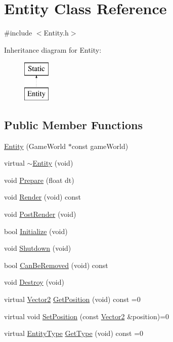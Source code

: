 \hypertarget{class_entity}{
\section{Entity Class Reference}
\label{class_entity}
}


{\ttfamily \#include $<$Entity.h$>$}

Inheritance diagram for Entity:\begin{figure}[H]
\begin{center}
\leavevmode
\includegraphics[height=2.000000cm]{class_entity}
\end{center}
\end{figure}
\subsection*{Public Member Functions}
\begin{DoxyCompactItemize}
\item 
\hyperlink{class_entity_af7b7088ca610b9f247110ccf47ed178b}{Entity} (GameWorld $\ast$const gameWorld)
\item 
virtual \hyperlink{class_entity_a6e8406be37172eb7f4e89dd3ba674113}{$\sim$Entity} (void)
\item 
void \hyperlink{class_entity_a0a0be12a8170540fed0ce3de68f46790}{Prepare} (float dt)
\item 
void \hyperlink{class_entity_a64da675ba3c24b2e4a3ee89917a5c970}{Render} (void) const 
\item 
void \hyperlink{class_entity_a8d03dea10779e4e91b4aef0fb7f571bc}{PostRender} (void)
\item 
bool \hyperlink{class_entity_a81982ee7714b5126e09ad3e82207f146}{Initialize} (void)
\item 
void \hyperlink{class_entity_a673a3a5c822c734d641e918a7a73f6e7}{Shutdown} (void)
\item 
bool \hyperlink{class_entity_a2da196bad22f7c5a95d47564c7d0ea04}{CanBeRemoved} (void) const 
\item 
void \hyperlink{class_entity_a71b297ca801c1b3170a885a6f4d481c1}{Destroy} (void)
\item 
virtual \hyperlink{struct_vector2}{Vector2} \hyperlink{class_entity_a26a31288cbf21650596a7b5a0adee7ee}{GetPosition} (void) const =0
\item 
virtual void \hyperlink{class_entity_a8b8556ee6351c6104eb49dcefd78398f}{SetPosition} (const \hyperlink{struct_vector2}{Vector2} \&position)=0
\item 
virtual \hyperlink{_entity_type_8h_ad79a57ed3105eb60d991a1aeb4a9dc44}{EntityType} \hyperlink{class_entity_a38188cc14a73fbcd0b7e5da55c709e2a}{GetType} (void) const =0
\end{DoxyCompactItemize}



